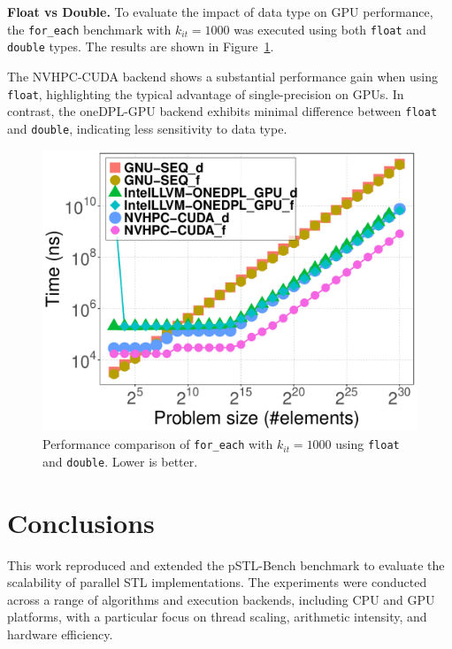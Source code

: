 \documentclass[sigconf]{acmart}
\newcommand{\mypar}[1]{{\bf #1.}}
\begin{document}
\mypar{Float vs Double}
To evaluate the impact of data type on GPU performance, the \texttt{for\_each}
benchmark with $k_{it} = 1000$ was executed using both \texttt{float} and
\texttt{double} types. The results are shown in
Figure~\ref{fig:gpu_float_vs_double}.

The NVHPC-CUDA backend shows a substantial performance gain when using
\texttt{float}, highlighting the typical advantage of single-precision on GPUs.
In contrast, the oneDPL-GPU backend exhibits minimal difference between
\texttt{float} and \texttt{double}, indicating less sensitivity to data type.

\begin{figure}[H]
      \centering
      \includegraphics[width=\linewidth]{figures/gpu-floatVSDouble-problemSize_time-for_each-k1000}
      \caption{Performance comparison of \texttt{for\_each} with $k_{it} = 1000$
            using \texttt{float} and \texttt{double}. Lower is better.}
      \label{fig:gpu_float_vs_double}
\end{figure}

\section{Conclusions}

This work reproduced and extended the pSTL-Bench benchmark to evaluate the
scalability of parallel STL implementations. The experiments were conducted
across a range of algorithms and execution backends, including CPU and GPU
platforms, with a particular focus on thread scaling, arithmetic intensity, and
hardware efficiency.
\end{document}
